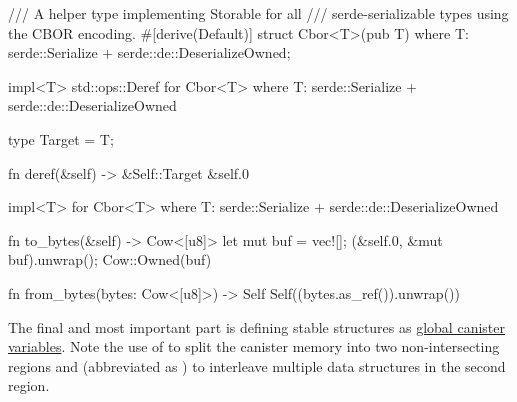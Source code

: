 \documentclass{article}
\begin{document}
\begin{code}[rust]
/// A helper type implementing Storable for all
/// serde-serializable types using the CBOR encoding.
#[derive(Default)]
struct Cbor<T>(pub T)
where T: serde::Serialize + serde::de::DeserializeOwned;

impl<T> std::ops::Deref for Cbor<T>
where T: serde::Serialize + serde::de::DeserializeOwned
{
  type Target = T;

  fn deref(&self) -> &Self::Target { &self.0 }
}

impl<T> \href{#storable-trait}{} for Cbor<T>
where T: serde::Serialize + serde::de::DeserializeOwned
{
  fn to_bytes(&self) -> Cow<[u8]> {
    let mut buf = vec![];
    \href{https://docs.rs/ciborium/0.2.0/ciborium/ser/fn.into_writer.html}{}(&self.0, &mut buf).unwrap();
    Cow::Owned(buf)
  }

  fn from_bytes(bytes: Cow<[u8]>) -> Self {
    Self(\href{https://docs.rs/ciborium/0.2.0/ciborium/de/fn.from_reader.html}{}(bytes.as_ref()).unwrap())
  }
}
\end{code}

The final and most important part is defining stable structures as \href{/posts/01-effective-rust-canisters.html#use-threadlocal}{global canister variables}.
Note the use of \href{#restricted-memory}{} to split the canister memory into two non-intersecting regions and \href{#memory-manager}{} (abbreviated as ) to interleave multiple data structures in the second region.
\end{document}
